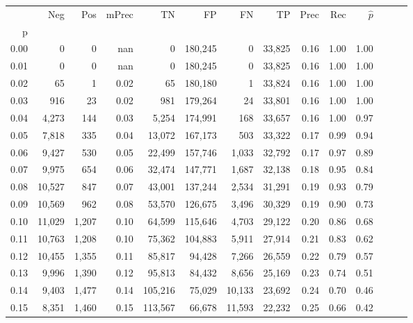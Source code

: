 \begin{tabular}{rrrrrrrrrrrrrr}
\toprule
{} &     Neg &    Pos & mPrec &       TN &       FP &      FN &      TP &  Prec &   Rec & $\hat{p}$ \\
p    &         &        &       &          &          &         &         &       &       &           \\
\midrule
0.00 &       0 &      0 &   nan &        0 &  180,245 &       0 &  33,825 &  0.16 &  1.00 &      1.00 \\
0.01 &       0 &      0 &   nan &        0 &  180,245 &       0 &  33,825 &  0.16 &  1.00 &      1.00 \\
0.02 &      65 &      1 &  0.02 &       65 &  180,180 &       1 &  33,824 &  0.16 &  1.00 &      1.00 \\
0.03 &     916 &     23 &  0.02 &      981 &  179,264 &      24 &  33,801 &  0.16 &  1.00 &      1.00 \\
0.04 &   4,273 &    144 &  0.03 &    5,254 &  174,991 &     168 &  33,657 &  0.16 &  1.00 &      0.97 \\
0.05 &   7,818 &    335 &  0.04 &   13,072 &  167,173 &     503 &  33,322 &  0.17 &  0.99 &      0.94 \\
0.06 &   9,427 &    530 &  0.05 &   22,499 &  157,746 &   1,033 &  32,792 &  0.17 &  0.97 &      0.89 \\
0.07 &   9,975 &    654 &  0.06 &   32,474 &  147,771 &   1,687 &  32,138 &  0.18 &  0.95 &      0.84 \\
0.08 &  10,527 &    847 &  0.07 &   43,001 &  137,244 &   2,534 &  31,291 &  0.19 &  0.93 &      0.79 \\
0.09 &  10,569 &    962 &  0.08 &   53,570 &  126,675 &   3,496 &  30,329 &  0.19 &  0.90 &      0.73 \\
0.10 &  11,029 &  1,207 &  0.10 &   64,599 &  115,646 &   4,703 &  29,122 &  0.20 &  0.86 &      0.68 \\
0.11 &  10,763 &  1,208 &  0.10 &   75,362 &  104,883 &   5,911 &  27,914 &  0.21 &  0.83 &      0.62 \\
0.12 &  10,455 &  1,355 &  0.11 &   85,817 &   94,428 &   7,266 &  26,559 &  0.22 &  0.79 &      0.57 \\
0.13 &   9,996 &  1,390 &  0.12 &   95,813 &   84,432 &   8,656 &  25,169 &  0.23 &  0.74 &      0.51 \\
0.14 &   9,403 &  1,477 &  0.14 &  105,216 &   75,029 &  10,133 &  23,692 &  0.24 &  0.70 &      0.46 \\
0.15 &   8,351 &  1,460 &  0.15 &  113,567 &   66,678 &  11,593 &  22,232 &  0.25 &  0.66 &      0.42 \\

\end{tabular}
